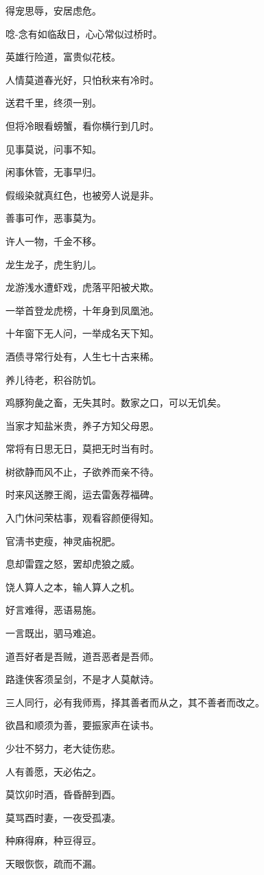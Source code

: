 \documentclass[12pt,oneside]{book}
\begin{document}
得宠思辱，安居虑危。

唸-{念}有如临敌日，心心常似过桥时。

英雄行险道，富贵似花枝。

人情莫道春光好，只怕秋来有冷时。

送君千里，终须一别。

但将冷眼看螃蟹，看你横行到几时。

见事莫说，问事不知。

闲事休管，无事早归。

假缎染就真红色，也被旁人说是非。

善事可作，恶事莫为。

许人一物，千金不移。

龙生龙子，虎生豹儿。

龙游浅水遭虾戏，虎落平阳被犬欺。

一举首登龙虎榜，十年身到凤凰池。

十年窗下无人问，一举成名天下知。

酒债寻常行处有，人生七十古来稀。

养儿待老，积谷防饥。

鸡豚狗彘之畜，无失其时。数家之口，可以无饥矣。

当家才知盐米贵，养子方知父母恩。

常将有日思无日，莫把无时当有时。

树欲静而风不止，子欲养而亲不待。

时来风送滕王阁，运去雷轰荐福碑。

入门休问荣枯事，观看容颜便得知。

官淸书吏瘦，神灵庙祝肥。

息却雷霆之怒，罢却虎狼之威。

饶人算人之本，输人算人之机。

好言难得，恶语易施。

一言既出，驷马难追。

道吾好者是吾贼，道吾恶者是吾师。

路逢侠客须呈剑，不是才人莫献诗。

三人同行，必有我师焉，择其善者而从之，其不善者而改之。

欲昌和顺须为善，要振家声在读书。

少壮不努力，老大徒伤悲。

人有善愿，天必佑之。

莫饮卯时酒，昏昏醉到酉。

莫骂酉时妻，一夜受孤凄。

种麻得麻，种豆得豆。

天眼恢恢，疏而不漏。
\end{document}
